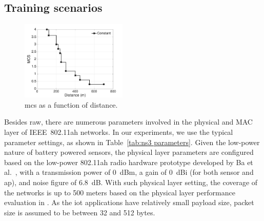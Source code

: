 

\subsection{Training scenarios \label{subsec:training scenarios}}


\begin{figure}[t]
  \centering
  \includegraphics[width=0.45\textwidth]{figures/distance-datarate}  \caption{\gls{mcs} as a function of distance. \label{fig:dist-datarate}}
\end{figure}

Besides \gls{raw}, there are numerous parameters involved in the physical and MAC layer of IEEE~802.11ah networks.
In our experiments, we use the typical parameter settings, 
as shown in Table~\ref{tab:ns3 parameters}. Given the low-power nature of battery powered sensors, the physical layer parameters are configured based on the low-power 802.11ah radio hardware prototype developed by Ba et al.~\cite{Ba2016}, with a transmission power of 0~dBm, a gain of 0~dBi (for both sensor and \gls{ap}), and noise figure of 6.8~dB. With such physical layer setting, the coverage of the networks is up to 500 meters based on the physical layer performance evaluation in \cite{bellekens2017outdoor}. As the \gls{iot} applications have relatively small payload size, packet size is assumed to be between 32 and 512 bytes.


